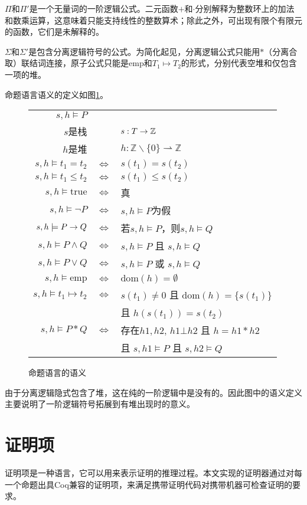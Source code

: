 $\Pi$和$\Pi'$是一个无量词的一阶逻辑公式。二元函数$+$和$\cdot$分别解释为整数环上的加法和数乘运算，这意味着只能支持线性的整数算术；除此之外，可出现有限个有限元的函数，它们是未解释的。

$\Sigma$和$\Sigma'$是包含分离逻辑符号的公式。为简化起见，分离逻辑公式只能用$\ast$（分离合取）联结词连接，原子公式只能是$\mathrm{emp}$和$T_1 \mapsto T_2$的形式，分别代表空堆和仅包含一项的堆。

命题语言语义的定义如图\ref{struct:semantic}。
\begin{figure}[!htbp]
  \centering
  \begin{tabular}{rcl}
    $s, h \models P$ & & \\
    $s$是栈 & & $s: T \rightarrow \mathbb{Z}$ \\
    $h$是堆 & & $h: \mathbb{Z} 	\backslash \{0\} \rightharpoonup \mathbb{Z}$ \\
    $s, h \models t_1 = t_2$ & $\iff$ & $s(t_1) = s(t_2)$ \\
    $s, h \models t_1 \leq t_2$ & $\iff$ & $s(t_1) \leq s(t_2)$ \\
    $s, h \models \mathrm{true}$ & $\iff$ & 真 \\
    $s, h \models \lnot P$ & $\iff$ & $s, h \models P$为假 \\
    $s, h \models P \rightarrow Q$ & $\iff$ & 若$s, h \models P$，则$s, h \models Q$ \\
    $s, h \models P \land Q$ & $\iff$ & $s, h \models P$ 且 $s, h \models Q$ \\
    $s, h \models P \lor Q$ & $\iff$ & $s, h \models P$ 或 $s, h \models Q$ \\
    $s, h \models \mathrm{emp}$ & $\iff$ & $\mathrm{dom}(h)= \emptyset$ \\
    $s, h \models t_1 \mapsto t_2$ & $\iff$ & $s(t_1) \neq 0$ 且 $\mathrm{dom}(h) = \{s(t_1)\}$ \\
    & & 且 $h(s(t_1)) = s(t_2)$ \\
    $s, h \models P \ast Q$ & $\iff$ & 存在$h1, h2$, $h1 \bot h2$ 且 $h = h1 \ast h2$ \\
    & & 且 $s, h1 \models P$ 且 $s, h2 \models Q$ \\
  \end{tabular}
  \caption{命题语言的语义}
  \label{struct:semantic}
\end{figure}

由于分离逻辑隐式包含了堆，这在纯的一阶逻辑中是没有的。因此图中的语义定义主要说明了一阶逻辑符号拓展到有堆出现时的意义。

\section{证明项}
证明项是一种语言，它可以用来表示证明的推理过程。本文实现的证明器通过对每一个命题出具Coq兼容的证明项，来满足携带证明代码对携带机器可检查证明的要求。

